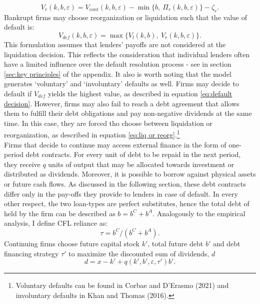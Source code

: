 \documentclass[12pt]{article}
\begin{document}
\begin{equation}
    V_{r}(k, b, \varepsilon) = V_{cont}(k,b,\varepsilon) - \min\{b, \ \Pi_{r}(k, b, \varepsilon)\} - \zeta_r.
\end{equation}
Bankrupt firms may choose reorganization or liquidation such that the value of default is:
\begin{equation} \label{eq:liq or reorg}
    V_{def}(k, b, \varepsilon) = \max \{ V_{l}(k, b), \ V_{r}(k, b, \varepsilon)  \}.
\end{equation}
This formulation assumes that lenders' payoffs are not considered at the liquidation decision. This reflects the consideration that individual lenders often have a limited influence over the default resolution process - see in section \ref{sec:key principles} of the appendix. It also is worth noting that the model generates `voluntary' and `involuntary' defaults as well. Firms may decide to default if $V_{def}$ yields the highest value, as described in equation \ref{eq:default decision}. However, firms may also fail to reach a debt agreement that allows them to fulfill their debt obligations and pay non-negative dividends at the same time. In this case, they are forced tho choose between liquidation or reorganization, as described in equation \ref{eq:liq or reorg}.\footnote{Voluntary defaults can be found in Corbae and D'Erasmo (2021) and involuntary defaults in Khan and Thomas (2016).}  \vspace{3mm} \\
Firms that decide to continue may access external finance in the form of one-period debt contracts. For every unit of debt to be repaid in the next period, they receive $q$ units of output that may be allocated towards investment or distributed as dividends. Moreover, it is possible to borrow against physical assets or future cash flows. As discussed in the following section, these debt contracts differ only in the pay-offs they provide to lenders in case of default. In every other respect, the two loan-types are perfect substitutes, hence the total debt of held by the firm can be described as $b = b^C+b^A$. Analogously to the empirical analysis, I define CFL reliance as: 
\begin{equation}
    \tau = b^C/(b^C+b^A).
\end{equation}
Continuing firms choose future capital stock $k'$, total future debt $b'$ and debt financing strategy $\tau'$ to maximize the discounted sum of dividends, $d$ 
\begin{equation} \label{eq:dividends}
d = x - k' +  q(k',b',\varepsilon, \tau')b'.
\end{equation} 
\end{document}
